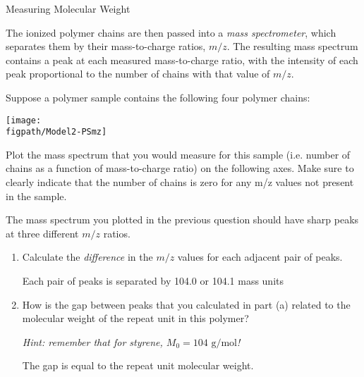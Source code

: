 \begin{activity}{Measuring Molecular Weight}
\begin{model}
	The ionized polymer chains are then passed into a \emph{mass spectrometer}, which separates them by their mass-to-charge ratios, $m/z$.  The resulting mass spectrum contains a peak at each measured mass-to-charge ratio, with the intensity of each peak proportional to the number of chains with that value of $m/z$. 

\end{model}

\begin{ctqs}

	\question Suppose a polymer sample contains the following four polymer chains: \label{\labelbase:ctq:PS-MALDI}
	
			\centerline{\texttt{[image: \\figpath/Model2-PSmz]}}
	
		Plot the mass spectrum that you would measure for this sample (i.e. number of chains as a function of mass-to-charge ratio) on the following axes.  Make sure to clearly indicate that the number of chains is zero for any m/z values not present in the sample.
		
			\begin{solution}[2in]
			\end{solution}
			
	\question The mass spectrum you plotted in the previous question should have sharp peaks at three different $m/z$ ratios.
	
		\begin{enumerate}
			\item Calculate the \emph{difference} in the $m/z$ values for each adjacent pair of peaks.
			
				\begin{solution}[0.75in]
					Each pair of peaks is separated by 104.0 or 104.1 mass units
				\end{solution}
			
			\item How is the gap between peaks that you calculated in part (a) related to the molecular weight of the repeat unit in this polymer?
			
				\emph{Hint: remember that for styrene, $M_0 = 104\text{ g/mol}$!}
			
				\begin{solution}[0.75in]
					The gap is equal to the repeat unit molecular weight.
				\end{solution}
			

\end{enumerate}
\end{ctqs}
\end{activity}

